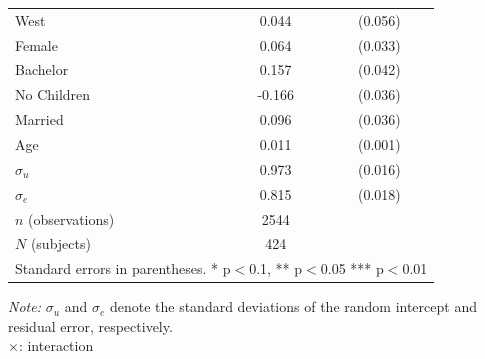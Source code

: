 \documentclass[12pt]{article}
\begin{document}
{\begin{table}[H]
{\begin{tabular}{l*{1}{cc}}
West        &       0.044         &     (0.056)\\
Female      &       0.064\sym{*}  &     (0.033)\\
Bachelor    &       0.157\sym{***}&     (0.042)\\
No Children &      -0.166\sym{***}&     (0.036)\\
Married     &       0.096\sym{***}&     (0.036)\\
Age         &       0.011\sym{***}&     (0.001)\\
$\sigma_u$      &       0.973\sym{***}&     (0.016)\\
$\sigma_e$      &       0.815\sym{***}&     (0.018)\\
\hline
\(n\) (observations)      &        2544         &            \\
\(N\) (subjects)      &        424         &            \\
\hline\hline
\multicolumn{3}{l}{\footnotesize Standard errors in parentheses.	*	p$<$0.1,	**	p$<$0.05	***	p$<$0.01}\\
\end{tabular}
}

\begin{tablenotes}
            \footnotesize
          
            \item \textit{Note:} $\sigma_u$ and $\sigma_e$ denote the standard deviations of the random intercept and residual error, respectively.\\
            $\times$: interaction\\
        \end{tablenotes}
\end{table}


\clearpage





}
\end{document}
